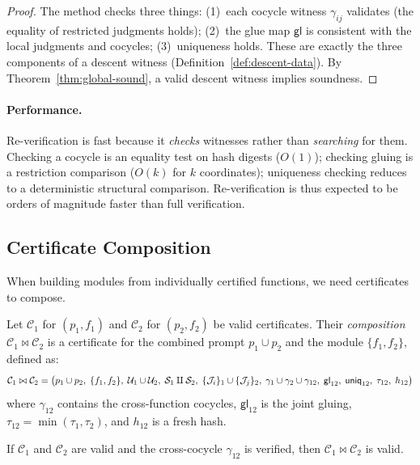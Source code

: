 \documentclass[11pt]{article}
\newcommand{\ProofCert}{\mathcal{C}}
\newcommand{\CoverFam}{\mathcal{U}}
\newcommand{\Cocycle}{\gamma}
\newcommand{\GlueMap}{\mathsf{gl}}
\newcommand{\UniqWit}{\mathsf{uniq}}
\newcommand{\CertCompose}{\bowtie}
\begin{document}
\begin{proof}
The method checks three things: (1)~each cocycle witness $\Cocycle_{ij}$
validates (\ie the equality of restricted judgments holds);
(2)~the glue map $\GlueMap$ is consistent with the local judgments and
cocycles; (3)~uniqueness holds.  These are exactly the three
components of a descent witness
(Definition~\ref{def:descent-data}).  By
Theorem~\ref{thm:global-sound}, a valid descent witness implies
soundness.
\end{proof}

\paragraph{Performance.}
Re-verification is fast because it \emph{checks} witnesses rather
than \emph{searching} for them.  Checking a cocycle is an equality
test on hash digests ($O(1)$); checking gluing is a restriction
comparison ($O(k)$ for $k$ coordinates); uniqueness checking reduces
to a deterministic structural comparison.  Re-verification is thus
expected to be orders of magnitude faster than full verification.

\subsection{Certificate Composition}\label{sec:cert-compose}

When building modules from individually certified functions, we need
certificates to compose.

\begin{definition}\label{def:cert-compose}
Let $\ProofCert_1$ for $(p_1, f_1)$ and $\ProofCert_2$ for
$(p_2, f_2)$ be valid certificates.  Their \emph{composition}
$\ProofCert_1 \CertCompose \ProofCert_2$ is a certificate for the
combined prompt $p_1 \cup p_2$ and the module $\{f_1, f_2\}$,
defined as:
\[
  \ProofCert_1 \CertCompose \ProofCert_2 =
  \bigl(p_1 \cup p_2,\; \{f_1, f_2\},\;
  \CoverFam_1 \cup \CoverFam_2,\; \Site_1 \amalg \Site_2,\;
  \{\J_i\}_1 \cup \{\J_j\}_2,\;
  \Cocycle_1 \cup \Cocycle_2 \cup \Cocycle_{12},\;
  \GlueMap_{12},\; \UniqWit_{12},\; \tau_{12},\; h_{12}\bigr)
\]
where $\Cocycle_{12}$ contains the cross-function cocycles,
$\GlueMap_{12}$ is the joint gluing, $\tau_{12} = \min(\tau_1, \tau_2)$,
and $h_{12}$ is a fresh hash.
\end{definition}

\begin{theorem}\label{thm:cert-compose}
If $\ProofCert_1$ and $\ProofCert_2$ are valid and the cross-cocycle
$\Cocycle_{12}$ is verified, then
$\ProofCert_1 \CertCompose \ProofCert_2$ is valid.
\end{theorem}
\end{document}
